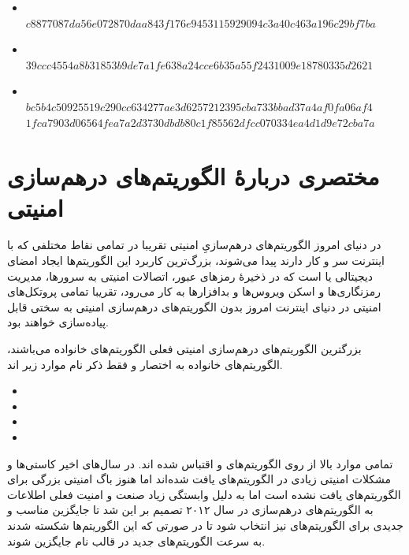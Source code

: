 \begin{itemize}
		
	\item {}\\
	      $c8877087da56e072870daa843f176e9453115929094c3a40c463a196c29bf7ba$
	\item {}\\
	      $39ccc4554a8b31853b9de7a1fe638a24cce6b35a55f2431009e18780335d2621$
	\item {}\\
	      $bc5b4c50925519c290cc634277ae3d6257212395cba733bbad37a4af0fa06af4$\\
	      $1fca7903d06564fea7a2d3730dbdb80c1f85562dfcc070334ea4d1d9e72cba7a$
	      
\end{itemize}

\section{مختصری دربارهٔ الگوریتم‌های درهم‌سازی امنیتی}
در دنیای امروز الگوریتم‌های درهم‌سازیِ امنیتی تقریبا در تمامی نقاط مختلفی که با اینترنت سر و کار دارند پیدا می‌شوند، بزرگ‌ترین کاربرد این الگوریتم‌ها ایجاد امضای دیجیتالی یا 
است که در ذخیرهٔ رمزهای عبور، اتصالات امنیتی به سرورها، مدیریت رمزنگاری‌ها و اسکن ویروس‌ها و بدافزارها به کار می‌رود، تقریبا تمامی پروتکل‌های امنیتی در دنیای اینترنت امروز بدون الگوریتم‌های درهم‌سازی امنیتی به سختی قابل پیاده‌سازی خواهند بود. 
\par
بزرگترین الگوریتم‌های درهم‌سازی امنیتی فعلی الگوریتم‌های خانواده 
می‌باشند، الگوریتم‌های خانواده 
به اختصار و فقط ذکر نام موارد زیر اند.
\begin{itemize}
	\item
	\item
	\item
	\item
\end{itemize}
تمامی موارد بالا از روی الگوریتم‌های 
 	و
اقتباس شده اند. 
در سال‌های اخیر کاستی‌ها و مشکلات امنیتی زیادی در الگوریتم‌های 
یافت شده‌اند اما هنوز باگ امنیتی بزرگی برای الگوریتم‌های 
یافت نشده است اما به دلیل وابستگی زیاد صنعت و امنیت فعلی اطلاعات به الگوریتم‌های درهم‌سازی در سال ۲۰۱۲ 
تصمیم بر این شد تا جایگزین مناسب و جدیدی برای الگوریتم‌های 
نیز انتخاب شود تا در صورتی که این الگوریتم‌ها شکسته شدند به سرعت الگوریتم‌های جدید در قالب نام 
جایگزین شوند. 

